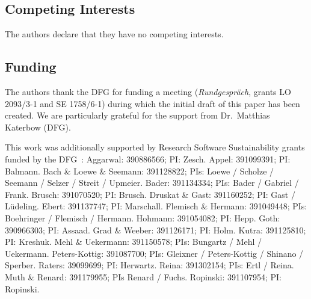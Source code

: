 \documentclass[a4paper,num-refs,numbers,sort&compress]{de-rse}
\begin{document}


\subsection{Competing Interests}
The authors declare that they have no competing interests.



\subsection{Funding}
The authors thank the DFG for funding a meeting (\textit{Rundgespr\"{a}ch}, grants LO
2093/3-1 and SE 1758/6-1) %
during which the initial draft of this paper has been created. We are particularly grateful for the support from Dr.\ Matthias Katerbow (DFG).

This work was additionally supported by Research Software Sustainability grants funded by the DFG~\cite{DFGfunded}:
    Aggarwal: 390886566; PI: Zesch.
    Appel: 391099391; PI: Balmann.
    Bach \& Loewe \& Seemann: 391128822; PIs: Loewe / Scholze / Seemann / Selzer / Streit / Upmeier.
    Bader: 391134334; PIs: Bader / Gabriel / Frank.
    Brusch: 391070520; PI: Brusch.
    Druskat \& Gast: 391160252; PI: Gast / L\"udeling.
    Ebert: 391137747; PI: Marschall.
    Flemisch \& Hermann: 391049448; PIs: Boehringer / Flemisch / Hermann.
    Hohmann: 391054082; PI: Hepp.
    Goth: 390966303; PI: Assaad.
    Grad \& Weeber: 391126171; PI: Holm.
    Kutra: 391125810; PI: Kreshuk.
    Mehl \& Uekermann: 391150578; PIs: Bungartz / Mehl / Uekermann.  
    Peters-Kottig: 391087700; PIs: Gleixner / Peters-Kottig / Shinano / Sperber.
    Raters: 39099699; PI: Herwartz.
    Reina: 391302154; PIs: Ertl / Reina.
    Muth \& Renard: 391179955; PIs Renard / Fuchs.
    Ropinski: 391107954; PI: Ropinski.
\end{document}
